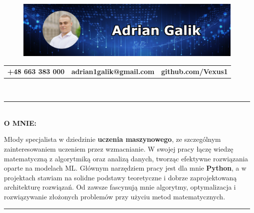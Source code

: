 \documentclass[10pt]{article}
\begin{document}
\begin{figure}[t]
    \hskip-1.55cm\includegraphics[scale=1.3625]{Galik_BANNER.png}
\end{figure}

\vspace*{-4ex}

\noindent
\begin{tabularx}{\textwidth}{l C{12cm} r}
    \textbf{+48 663 383 000} &
    \textbf{adrian1galik@gmail.com} &
    \textbf{github.com/Vexus1}
\end{tabularx} \\
\rule{\textwidth}{1pt} \\

\noindent \fontsize{14pt}{14pt}\selectfont \textbf{\color{Violet}O MNIE:}
\fontsize{10pt}{10pt}\selectfont

\noindent Młody specjalista w dziedzinie \textbf{uczenia maszynowego}, ze szczególnym zainteresowaniem uczeniem przez wzmacnianie.
W swojej pracy łączę wiedzę matematyczną z algorytmiką oraz analizą danych, tworząc efektywne rozwiązania oparte na modelach ML. 
Głównym narzędziem pracy jest dla mnie \textbf{Python}, a w projektach stawiam na solidne podstawy teoretyczne i dobrze zaprojektowaną architekturę rozwiązań.
Od zawsze fascynują mnie algorytmy, optymalizacja i rozwiązywanie złożonych problemów przy użyciu metod matematycznych.

\noindent \rule{\textwidth}{1pt} \\
\end{document}
